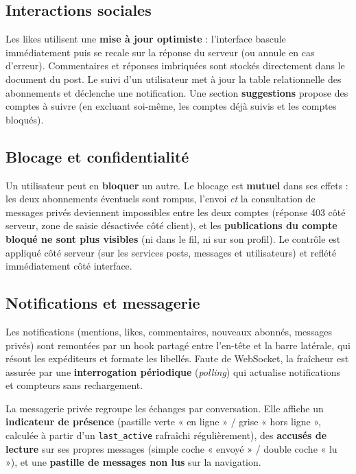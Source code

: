 \subsection{Interactions sociales}

Les likes utilisent une \textbf{mise à jour optimiste} : l'interface bascule
immédiatement puis se recale sur la réponse du serveur (ou annule en cas d'erreur).
Commentaires et réponses imbriquées sont stockés directement dans le document du
post. Le suivi d'un utilisateur met à jour la table relationnelle des abonnements
et déclenche une notification. Une section \textbf{suggestions} propose des comptes
à suivre (en excluant soi-même, les comptes déjà suivis et les comptes bloqués).

\newpage

\subsection{Blocage et confidentialité}

Un utilisateur peut en \textbf{bloquer} un autre. Le blocage est \textbf{mutuel}
dans ses effets : les deux abonnements éventuels sont rompus, l'envoi \emph{et} la
consultation de messages privés deviennent impossibles entre les deux comptes
(réponse 403 côté serveur, zone de saisie désactivée côté client), et les
\textbf{publications du compte bloqué ne sont plus visibles} (ni dans le fil, ni
sur son profil). Le contrôle est appliqué côté serveur (sur les services posts,
messages et utilisateurs) et reflété immédiatement côté interface.

\subsection{Notifications et messagerie}

Les notifications (mentions, likes, commentaires, nouveaux abonnés, messages
privés) sont remontées par un hook partagé entre l'en-tête et la barre latérale,
qui résout les expéditeurs et formate les libellés. Faute de WebSocket, la
fraîcheur est assurée par une \textbf{interrogation périodique} (\textit{polling})
qui actualise notifications et compteurs sans rechargement.

La messagerie privée regroupe les échanges par conversation. Elle affiche un
\textbf{indicateur de présence} (pastille verte « en ligne » / grise « hors
ligne », calculée à partir d'un \texttt{last\_active} rafraîchi régulièrement), des
\textbf{accusés de lecture} sur ses propres messages (simple coche « envoyé » /
double coche « lu »), et une \textbf{pastille de messages non lus} sur la
navigation.

